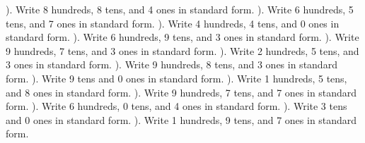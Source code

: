 \documentclass{article}%
\begin{document}
). Write 8 hundreds, 8 tens, and 4 ones in standard form.%
\newline%
\newline%
). Write 6 hundreds, 5 tens, and 7 ones in standard form.%
\newline%
\newline%
). Write 4 hundreds, 4 tens, and 0 ones in standard form.%
\newline%
\newline%
). Write 6 hundreds, 9 tens, and 3 ones in standard form.%
\newline%
\newline%
). Write 9 hundreds, 7 tens, and 3 ones in standard form.%
\newline%
\newline%
). Write 2 hundreds, 5 tens, and 3 ones in standard form.%
\newline%
\newline%
). Write 9 hundreds, 8 tens, and 3 ones in standard form.%
\newline%
\newline%
). Write 9 tens and 0 ones in standard form.%
\newline%
\newline%
). Write 1 hundreds, 5 tens, and 8 ones in standard form.%
\newline%
\newline%
). Write 9 hundreds, 7 tens, and 7 ones in standard form.%
\newline%
\newline%
). Write 6 hundreds, 0 tens, and 4 ones in standard form.%
\newline%
\newline%
). Write 3 tens and 0 ones in standard form.%
\newline%
\newline%
). Write 1 hundreds, 9 tens, and 7 ones in standard form.%
\end{document}

